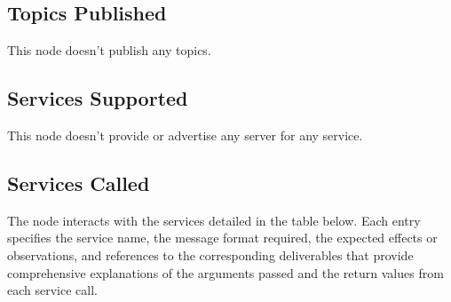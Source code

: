 \documentclass{CSSRforAfrica}
\begin{document}
\subsection{Topics Published}
This node doesn't publish any topics.

\subsection{Services Supported}
This node doesn't provide or advertise any server for any service.

\newpage
\subsection{Services Called}
The node interacts with the services detailed in the table below. Each entry specifies the service name, the message format required, the expected effects or observations, and references to the corresponding deliverables that provide comprehensive explanations of the arguments passed and the return values from each service call.
\end{document}
